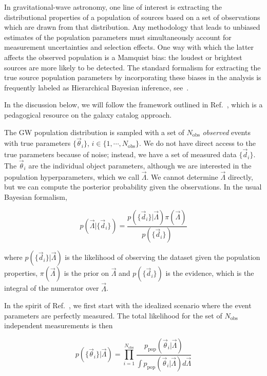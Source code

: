 \documentclass[%
preprint,
nofootinbib,
 amsmath,amssymb,
 aps,
]{revtex4-2}
\newcommand{\given}[2]{p( #1 | #2 )}
\newcommand{\ppop}[0]{p_{\text{pop}}}
\newcommand{\nobs}[0]{N_{\text{obs}}}
\begin{document}
In gravitational-wave astronomy, one line of interest is extracting the distributional properties
of a population of sources based on a set of observations which are drawn from that distribution.
Any methodology that leads to unbiased estimates of the population parameters must simultaneously
account for measurement uncertainties and selection effects. One way with which the latter affects
the observed population is a Mamquist bias: the loudest or brightest sources are more likely to be
detected. The standard formalism for extracting the true source population parameters by
incorporating these biases in the analysis is frequently labeled as Hierarchical Bayesian
inference, see~\cite{Loredo:2004nn,Mandel:2018mve,Vitale_2021}.

In the discussion below, we will follow the framework outlined in Ref.~,
which is a pedagogical resource on the galaxy catalog approach.

The GW population distribution is sampled with a set of $\nobs$ \textit{observed} events with true
parameters $\{ \vec{\theta}_i \}$, $i \in \{1, \cdots, \nobs\}$. We do not have direct access to
the true parameters because of noise; instead, we have a set of measured data $\{ \vec{d}_i \}$.
The $\vec{\theta}_i$ are the individual object parameters, although we are interested in the
population hyperparameters, which we call $\vec{\Lambda}$. We cannot determine $\vec{\Lambda}$
directly, but we can compute the posterior probability given the observations. In the usual
Bayesian formalism,

\begin{equation}
	\given{\vec{\Lambda}}{\{\vec{d}_i \}} =
	\frac{\given{\{\vec{d}_i \}}{\vec{\Lambda}} \pi(\vec{\Lambda})}{p(\{\vec{d}_i \})}
\end{equation}

where $\given{\{\vec{d}_i \}}{\vec{\Lambda}}$ is the likelihood of observing the dataset given the
population properties, $\pi(\vec{\Lambda})$ is the prior on $\vec{\Lambda}$ and $p(\{\vec{d}_i \})$
is the evidence, which is the integral of the numerator over $\vec{\Lambda}$.

In the spirit of Ref.~, we first start with the idealized scenario where
the event parameters are perfectly measured. The total likelihood for the set of $\nobs$
independent measurements is then

\begin{equation}
	\label{eq:stat:posterior-no-noise-no-bias}
	\given{\{ \vec{\theta}_i \}}{\vec{\Lambda}} =
	\prod_{i=1}^{\nobs} \frac{\ppop(\vec{\theta}_i | \vec{\Lambda})}{\int \ppop(\vec{\theta}_i | \vec{\Lambda}) d\vec{\Lambda}}
\end{equation}
\end{document}
